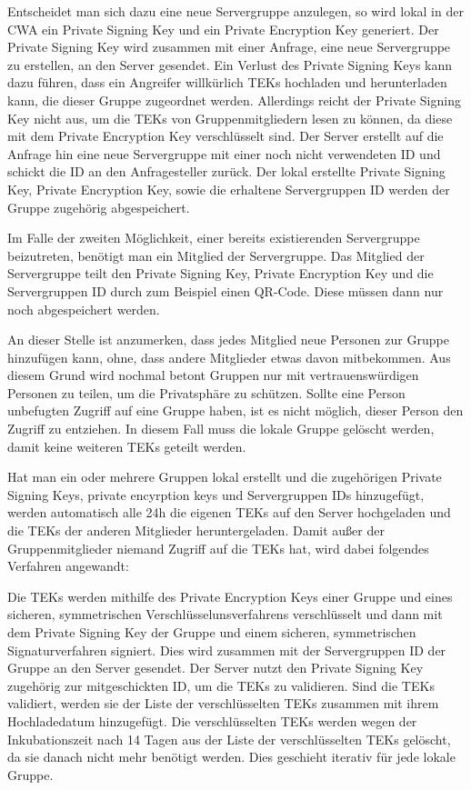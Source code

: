 \documentclass[conference,compsoc]{IEEEtran}
\begin{document}
Entscheidet man sich dazu eine neue Servergruppe anzulegen, so wird lokal in der CWA ein Private Signing Key und ein Private Encryption Key generiert.
Der Private Signing Key wird zusammen mit einer Anfrage, eine neue Servergruppe zu erstellen, an den Server gesendet.
Ein Verlust des Private Signing Keys kann dazu führen, dass ein Angreifer willkürlich TEKs hochladen und herunterladen kann, die dieser Gruppe zugeordnet werden.
Allerdings reicht der Private Signing Key nicht aus, um die TEKs von Gruppenmitgliedern lesen zu können, da diese mit dem Private Encryption Key verschlüsselt sind.
Der Server erstellt auf die Anfrage hin eine neue Servergruppe mit einer noch nicht verwendeten ID und schickt die ID an den Anfragesteller zurück.
Der lokal erstellte Private Signing Key, Private Encryption Key, sowie die erhaltene Servergruppen ID werden der Gruppe zugehörig abgespeichert.

Im Falle der zweiten Möglichkeit, einer bereits existierenden Servergruppe beizutreten, benötigt man ein Mitglied der Servergruppe.
Das Mitglied der Servergruppe teilt den Private Signing Key, Private Encryption Key und die Servergruppen ID durch zum Beispiel einen QR-Code.
Diese müssen dann nur noch abgespeichert werden.

An dieser Stelle ist anzumerken, dass jedes Mitglied neue Personen zur Gruppe hinzufügen kann, ohne, dass andere Mitglieder etwas davon mitbekommen.
Aus diesem Grund wird nochmal betont Gruppen nur mit vertrauenswürdigen Personen zu teilen, um die Privatsphäre zu schützen.
Sollte eine Person unbefugten Zugriff auf eine Gruppe haben, ist es nicht möglich, dieser Person den Zugriff zu entziehen.
In diesem Fall muss die lokale Gruppe gelöscht werden, damit keine weiteren TEKs geteilt werden.

Hat man ein oder mehrere Gruppen lokal erstellt und die zugehörigen Private Signing Keys, private encyrption keys und Servergruppen IDs hinzugefügt, werden automatisch alle 24h die eigenen TEKs auf den Server hochgeladen und die TEKs der anderen Mitglieder heruntergeladen.
Damit außer der Gruppenmitglieder niemand Zugriff auf die TEKs hat, wird dabei folgendes Verfahren angewandt:

Die TEKs werden mithilfe des Private Encryption Keys einer Gruppe und eines sicheren, symmetrischen Verschlüsselunsverfahrens verschlüsselt und dann mit dem Private Signing Key der Gruppe und einem sicheren, symmetrischen Signaturverfahren signiert.
Dies wird zusammen mit der Servergruppen ID der Gruppe an den Server gesendet.
Der Server nutzt den Private Signing Key zugehörig zur mitgeschickten ID, um die TEKs zu validieren.
Sind die TEKs validiert, werden sie der Liste der verschlüsselten TEKs zusammen mit ihrem Hochladedatum hinzugefügt.
Die verschlüsselten TEKs werden wegen der Inkubationszeit nach 14 Tagen aus der Liste der verschlüsselten TEKs gelöscht, da sie danach nicht mehr benötigt werden.
Dies geschieht iterativ für jede lokale Gruppe.
\end{document}
